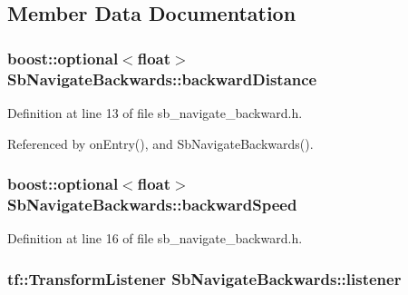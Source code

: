 \subsection{Member Data Documentation}
\subsubsection[{\texorpdfstring{backward\+Distance}{backwardDistance}}]{\setlength{\rightskip}{0pt plus 5cm}boost\+::optional$<$float$>$ Sb\+Navigate\+Backwards\+::backward\+Distance}\hypertarget{classSbNavigateBackwards_ad7e0e6b09dae085c1106335e208d6e84}{}\label{classSbNavigateBackwards_ad7e0e6b09dae085c1106335e208d6e84}


Definition at line 13 of file sb\+\_\+navigate\+\_\+backward.\+h.



Referenced by on\+Entry(), and Sb\+Navigate\+Backwards().

\subsubsection[{\texorpdfstring{backward\+Speed}{backwardSpeed}}]{\setlength{\rightskip}{0pt plus 5cm}boost\+::optional$<$float$>$ Sb\+Navigate\+Backwards\+::backward\+Speed}\hypertarget{classSbNavigateBackwards_a011e358beaab0f8f7fbd74f292b26c43}{}\label{classSbNavigateBackwards_a011e358beaab0f8f7fbd74f292b26c43}


Definition at line 16 of file sb\+\_\+navigate\+\_\+backward.\+h.

\subsubsection[{\texorpdfstring{listener}{listener}}]{\setlength{\rightskip}{0pt plus 5cm}tf\+::\+Transform\+Listener Sb\+Navigate\+Backwards\+::listener}\hypertarget{classSbNavigateBackwards_a23f881d6f742d683a2f6b671c21688cc}{}\label{classSbNavigateBackwards_a23f881d6f742d683a2f6b671c21688cc}


